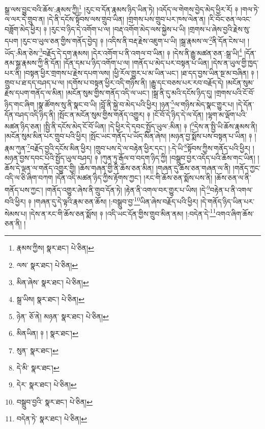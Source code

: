 སྒྲ་ལས་བྱུང་བའི་ཆོས་:རྣམས་ཀྱི།\footnote{རྣམས་ཀྱིས།  སྣར་ཐང་།  པེ་ཅིན། } །རུང་བ་དོན་རྣམས་ཉིད་ཡིན་ཏེ། །འདོད་ལ་གེགས་བྱེད་མེད་ཕྱིར་རོ། ༈ །གལ་ཏེ་ལ་ལར་དེ་གྲུབ་ན། །དེ་ནི་དངོས་སྟོབས་ལས་གྲུབ་ཡིན། །གྲགས་པས་གྲུབ་པར་ཁས་ལེན་ན། །རི་བོང་ཅན་ལའང་བཟློག་མེད་ཕྱིར། ༈ །རུང་བ་ཉིད་དེ་འགོག་པ་ལ། །བརྡ་འགོག་མེད་ལས་སྐྱེས་པ་ཡི། །གྲགས་པ་ཞེས་བྱའི་རྗེས་སུ་དཔག །རུང་བ་ཡུལ་ཅན་གྱིས་གནོད་བྱེད། ༈ །འདིས་ནི་བརྡ་རྗེས་འཇུག་པ་ཡི། །སྒྲ་རྣམས་ལ་\footnote{ལས་  སྣར་ཐང་།  པེ་ཅིན། }ནི་དོན་ངེས་པ། །ཡོད་:མིན་ཅེས་\footnote{མིན་ཞེས་  སྣར་ཐང་།  པེ་ཅིན། }བརྗོད་དེ་དག་རྣམས། །དེར་འགོག་པ་ནི་འགལ་བ་ཡིན། ༈ །དེས་ནི་རྒྱུ་མཚན་ཅན་:སྒྲ་ཡི།\footnote{སྒྲ་ཡིས།  སྣར་ཐང་།  པེ་ཅིན། } །དོན་ནམ་སྒྲ་རྣམས་ཀྱི་ནི་དོན། །དོན་དམ་པ་ཉིད་འགོག་པ་ལ། །གནོད་པ་མེད་པར་བསྟན་པ་ཡིན། །དེས་ན་ཡུལ་གྱི་ཁྱད་པར་ནི། །བསྟན་ཕྱིར་གྲགས་པ་རྗེས་དཔག་ལས། །ཕྱི་རོལ་གྱུར་པ་མ་ཡིན་ཡང་། །ཐ་དད་བྱས་ཡིན་སྔ་མ་བཞིན། ༈ །གྲུབ་པ་ཐ་དད་བཤད་པ་ལ། །དགོས་པ་བསྟན་ཕྱིར་འདི་གཉིས་ནི། །རྒྱུ་དང་བཅས་པར་རབ་བརྗོད་དེ། །མངོན་སུམ་རྗེས་དཔག་གནོད་ལ་མིན། །མངོན་སུམ་གྱིས་གནོད་འདི་ལ་ཡང་། །སྒྲ་ནི་དུ་མའི་དངོས་ཉིད་དུ། །གྲགས་པའི་ངོ་བོ་ཉིད་གང་ཞིག །སྣ་ཚོགས་སུ་ནི་སྣང་བ་ཡི། །བློ་ནི་སྐྱེ་བ་མེད་པའི་ཕྱིར། །ཉན་\footnote{ཉེན་  ཅོ་ནེ། མཉན་  སྣར་ཐང་།  པེ་ཅིན། }ལ་གཉིས་མེད་སྣང་གྱུར་པ། །དེ་དོན་དོན་བཤད་འདི་ཉིད་ནི། །སྤོང་ན་མངོན་སུམ་གྱིས་གནོད་འགྱུར། ༈ །ངོ་བོ་དེ་ཉིད་དེ་ལ་དོན། །ལྷག་མ་ལྡོག་པའི་མཚན་ཉིད་ཅན། །སྤྱི་ནི་དངོས་མེད་ངོ་བོ་ཡིན། །དེ་ཕྱིར་དེ་དབང་སྤྱོད་ཡུལ་:མིན། ༈ །\footnote{མིནཡིན། ༈ །  སྣར་ཐང་། }དེས་ན་སྤྱི་ཡི་ཆོས་རྣམས་ནི། །མངོན་སུམ་མིན་པར་གྲུབ་པའི་ཕྱིར། །སྤོང་ཡང་གནོད་པ་ཡོད་མིན་ཞེས། །མཉན་བྱ་སྨོས་པས་བསྟན་པ་ཡིན། ༈ །རྣམ་ཀུན་\footnote{སུན་  སྣར་ཐང་། }བརྗོད་བྱའི་དངོས་མིན་ཕྱིར། །གྲུབ་པས་དེ་ལ་བརྟེན་ཕྱིར་དང་། །:དེ་ཡི་\footnote{དེ་མི་  སྣར་ཐང་། }སྟོབས་ཀྱིས་གནོད་པའི་ཕྱིར། །མཉན་བྱས་དབང་པོའི་སྤྱོད་ཡུལ་བཤད། ༈ །ཀུན་ཏུ་རྒོལ་བ་བདག་ཉིད་ཀྱི། །བསྒྲུབ་བྱར་འདོད་པའི་ཆོས་གང་ཡིན། །ཆོས་དེ་ལྡན་ལ་གནོད་འགྱུར་གྱི། །ཆོས་གཞན་གྱི་ནི་ཆོས་ཅན་མིན། །གཞན་དུ་ཆོས་ཅན་གཞན་ལ་ནི། །གནོད་ཀྱང་འདི་ལ་ཅི་ཞིག་བཀག །དོན་འདི་མཚན་ཉིད་ཀྱིས་རྟོགས་ཀྱང་། །རང་གི་ཆོས་ཅན་སྨོས་པས་ནི། །ཆོས་ཅན་ལ་ནི་གནོད་པས་ཀྱང་། །གནོད་འགྱུར་ཞེས་ནི་གྲུབ་དོན་ཏེ། །རྟེན་ནི་འགལ་བར་གྱུར་པ་ཡིས། །དེ་\footnote{དེར་  སྣར་ཐང་།  པེ་ཅིན། }བརྟེན་པ་ནི་འགལ་བའི་ཕྱིར། ༈ །གཞན་དུ་དེ་ལྟའི་རྣམ་ཅན་ཆོས། །:བསྒྲུབ་བྱ་\footnote{བསྒྲུབ་བྱའི་  སྣར་ཐང་།  པེ་ཅིན། }ཡིན་ཞེས་བརྗོད་པའི་ཕྱིར། །དེ་གནོད་ཉིད་ཡིན་པར་སེམས་པ། །དེས་ན་རང་གི་ཆོས་ཅན་སྨོས། ༈ །འདི་ཡང་དོན་གྱིས་གྲུབ་མིན་ནམ། །:བདེན་དེ་\footnote{བདེན་ཏེ་  སྣར་ཐང་།  པེ་ཅིན། }འགའ་ཞིག་ཆོས་ཅན་ནི། །
